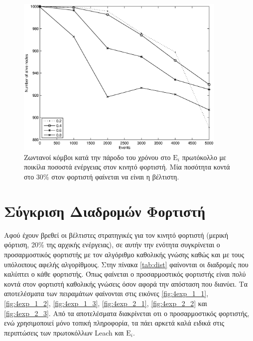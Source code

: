 \begin{figure}[H]
  \centering
   \includegraphics[width=0.9\textwidth]{experiments/classic/3.smallVSbigpercentage/alive_nodes_ei_rc_per_our.eps}
  \caption{Ζωντανοί κόμβοι κατά την πάροδο του χρόνου στο $\text{E}_{i}$ πρωτόκολλο με ποικίλα ποσοστά ενέργειας στον κινητό φορτιστή. Μία ποσότητα κοντά στο 30\%
στον φορτιστή φαίνεται να είναι η βέλτιστη.}
  \label{fig:3exp_1_3}
\end{figure}


\section{Σύγκριση Διαδρομών Φορτιστή}\label{sc:result4}
Αφού έχουν βρεθεί οι βέλτιστες στρατηγικές για τον κινητό φορτιστή (μερική φόρτιση, 20\% της αρχικής ενέργειας), σε αυτήν την ενότητα συγκρίνεται ο προσαρμοστικός
φορτιστής με τον αλγόριθμο καθολικής γνώσης καθώς και με τους υπόλοιπους αφελής αλγορίθμους. Στην πίνακα \ref{tab:dist} φαίνονται οι διαδρομές που καλύπτει ο κάθε
φορτιστής. Όπως φαίνεται ο προσαρμοστικός φορτιστής είναι πολύ κοντά στον φορτιστή καθολικής γνώσεις όσον αφορά την απόσταση που διανύει. Τα αποτελέσματα των
πειραμάτων φαίνονται στις εικόνες \ref{fig:4exp_1_1}, \ref{fig:4exp_1_2}, \ref{fig:4exp_1_3}, \ref{fig:4exp_2_1}, \ref{fig:4exp_2_2} και \ref{fig:4exp_2_3}. Από τα
αποτελέσματα διακρίνεται οτι ο προσαρμοστικός φορτιστής, ενώ χρησιμοποιεί μόνο τοπική πληροφορία, τα πάει αρκετά καλά ειδικά στις περιπτώσεις των πρωτοκόλλων Leach
και $\text{E}_{i}$.

